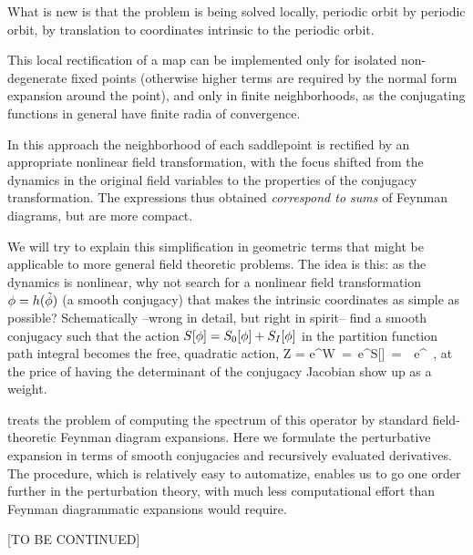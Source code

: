 What is new is that the problem is being solved locally, periodic orbit
by periodic orbit, by translation to coordinates intrinsic to the
periodic orbit.

This local rectification of a map can be implemented only for isolated
non-degenerate fixed points (otherwise higher terms are required by the
normal form expansion around the point), and only in finite
neighborhoods, as the conjugating functions in general have finite radia
of convergence.

In this approach the neighborhood of each saddlepoint is rectified by an
appropriate nonlinear field transformation, with the focus shifted from
the dynamics in the original field variables to the properties of the
conjugacy transformation. The expressions thus obtained \emph{correspond
to sums} of Feynman diagrams, but are more compact.

We will try to explain this simplification in geometric terms that might
be applicable to more general field theoretic problems. The idea is this:
as the dynamics is nonlinear, why not search for a nonlinear field
transformation ${\phi} = h(\tilde{{\phi}})$ (a smooth conjugacy) that
makes the intrinsic coordinates as simple as possible? Schematically
--wrong in detail, but right in spirit-- find a smooth conjugacy such
that the action $S[{\phi}] = S_0[{\phi}] + S_I[{\phi}]$ in the partition
function path integral becomes the free, quadratic action,
\beq
Z %
	 =  e^{W} %
\,=\, \int [d\field] e^{S[\field]} %
\,=\, 
      \, e^{
      \transp{\tilde{\field}}\tilde{\field}
            }
\,,
\label{Z-J}
\eeq
at the price of having the determinant of the
conjugacy Jacobian show up as a weight.

 treats the problem of computing the spectrum of this
operator by standard field-theoretic Feynman diagram expansions. Here we
formulate the perturbative expansion in terms of smooth conjugacies and
recursively evaluated derivatives. The procedure, which is relatively
easy to automatize, enables us to go one order further in the
perturbation theory, with much less computational effort than Feynman
diagrammatic expansions would require.

[TO BE CONTINUED]
